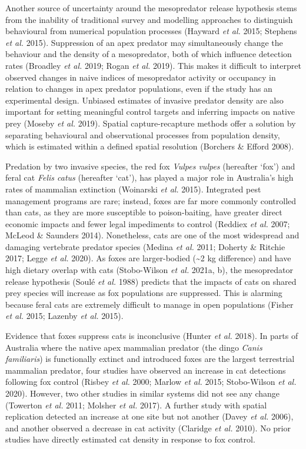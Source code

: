 \documentclass[11pt,a4paper,titlepage,twoside,openright]{style/unimelbthesis}
\begin{document}
\begin{mainmatter}
Another source of uncertainty around the mesopredator release hypothesis stems from the inability of traditional survey and modelling approaches to distinguish behavioural from numerical population processes (Hayward \emph{et al.} 2015; Stephens \emph{et al.} 2015). Suppression of an apex predator may simultaneously change the behaviour and the density of a mesopredator, both of which influence detection rates (Broadley \emph{et al.} 2019; Rogan \emph{et al.} 2019). This makes it difficult to interpret observed changes in naive indices of mesopredator activity or occupancy in relation to changes in apex predator populations, even if the study has an experimental design. Unbiased estimates of invasive predator density are also important for setting meaningful control targets and inferring impacts on native prey (Moseby \emph{et al.} 2019). Spatial capture-recapture methods offer a solution by separating behavioural and observational processes from population density, which is estimated within a defined spatial resolution (Borchers \& Efford 2008).

Predation by two invasive species, the red fox \emph{Vulpes vulpes} (hereafter `fox') and feral cat \emph{Felis catus} (hereafter `cat'), has played a major role in Australia's high rates of mammalian extinction (Woinarski \emph{et al.} 2015). Integrated pest management programs are rare; instead, foxes are far more commonly controlled than cats, as they are more susceptible to poison-baiting, have greater direct economic impacts and fewer legal impediments to control (Reddiex \emph{et al.} 2007; McLeod \& Saunders 2014). Nonetheless, cats are one of the most widespread and damaging vertebrate predator species (Medina \emph{et al.} 2011; Doherty \& Ritchie 2017; Legge \emph{et al.} 2020). As foxes are larger-bodied (\textasciitilde2 kg difference) and have high dietary overlap with cats (Stobo-Wilson \emph{et al.} 2021a, b), the mesopredator release hypothesis (Soulé \emph{et al.} 1988) predicts that the impacts of cats on shared prey species will increase as fox populations are suppressed. This is alarming because feral cats are extremely difficult to manage in open populations (Fisher \emph{et al.} 2015; Lazenby \emph{et al.} 2015).

Evidence that foxes suppress cats is inconclusive (Hunter \emph{et al.} 2018). In parts of Australia where the native apex mammalian predator (the dingo \emph{Canis familiaris}) is functionally extinct and introduced foxes are the largest terrestrial mammalian predator, four studies have observed an increase in cat detections following fox control (Risbey \emph{et al.} 2000; Marlow \emph{et al.} 2015; Stobo-Wilson \emph{et al.} 2020). However, two other studies in similar systems did not see any change (Towerton \emph{et al.} 2011; Molsher \emph{et al.} 2017). A further study with spatial replication detected an increase at one site but not another (Davey \emph{et al.} 2006), and another observed a decrease in cat activity (Claridge \emph{et al.} 2010). No prior studies have directly estimated cat density in response to fox control.


\end{mainmatter}
\end{document}
